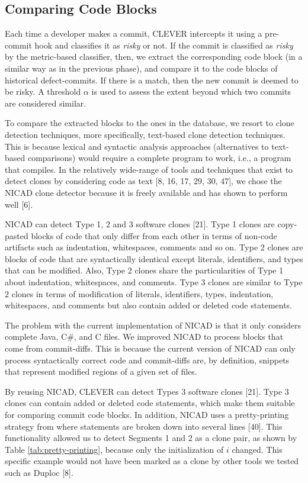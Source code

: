\documentclass[sigconf]{acmart}
\begin{document}
\subsection{Comparing Code Blocks}\label{sec:online}

Each time a developer makes a commit, CLEVER intercepts it using a
pre-commit hook and classifies it as \emph{risky} or not. If the commit
is classified as \emph{risky} by the metric-based classifier, then, we
extract the corresponding code block (in a similar way as in the
previous phase), and compare it to the code blocks of historical
defect-commits. If there is a match, then the new commit is deemed to be
risky. A threshold \(\alpha\) is used to assess the extent beyond which
two commits are considered similar.

To compare the extracted blocks to the ones in the database, we resort
to clone detection techniques, more specifically, text-based clone
detection techniques. This is because lexical and syntactic analysis
approaches (alternatives to text-based comparisons) would require a
complete program to work, i.e., a program that compiles. In the
relatively wide-range of tools and techniques that exist to detect
clones by considering code as text [8, 16, 17, 29, 30, 47], we chose
the NICAD clone detector because it is freely available and has shown to
perform well [6].

NICAD can detect Type 1, 2 and 3 software clones [21]. Type 1 clones
are copy-pasted blocks of code that only differ from each other in terms
of non-code artifacts such as indentation, whitespaces, comments and so
on. Type 2 clones are blocks of code that are syntactically identical
except literals, identifiers, and types that can be modified. Also, Type
2 clones share the particularities of Type 1 about indentation,
whitespaces, and comments. Type 3 clones are similar to Type 2 clones in
terms of modification of literals, identifiers, types, indentation,
whitespaces, and comments but also contain added or deleted code
statements.

The problem with the current implementation of NICAD is that it only
considers complete Java, C\#, and C files. We improved NICAD to process
blocks that come from commit-diffs. This is because the current version
of NICAD can only process syntactically correct code and commit-diffs
are, by definition, snippets that represent modified regions of a given
set of files.

By reusing NICAD, CLEVER can detect Types 3 software clones [21].
Type 3 clones can contain added or deleted code statements, which make
them suitable for comparing commit code blocks. In addition, NICAD uses
a pretty-printing strategy from where statements are broken down into
several lines [40]. This functionality allowed us to detect Segments
1 and 2 as a clone pair, as shown by Table \ref{tab:pretty-printing},
because only the initialization of \(i\) changed. This specific example
would not have been marked as a clone by other tools we tested such as
Duploc [8].
\end{document}

